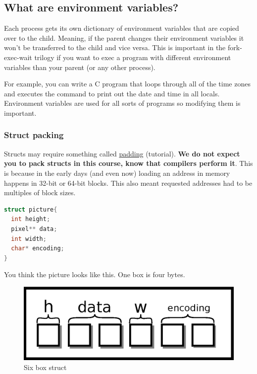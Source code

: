 \subsection{What are environment variables?}

Each process gets its own dictionary of environment variables that are copied over to the child. Meaning, if the parent changes their environment variables it won't be transferred to the child and vice versa. This is important in the fork-exec-wait trilogy if you want to exec a program with different environment variables than your parent (or any other process).

For example, you can write a C program that loops through all of the time zones and executes the  command to print out the date and time in all locals. Environment variables are used for all sorts of programs so modifying them is important.


\subsubsection{Struct packing}

Structs may require something called \href{http://www.catb.org/esr/structure-packing/}{padding} (tutorial).
\textbf{We do not expect you to pack structs in this course, know that compilers perform it}.
This is because in the early days (and even now) loading an address in memory happens in 32-bit or 64-bit blocks.
This also meant requested addresses had to be multiples of block sizes.

\begin{lstlisting}[language=C]
struct picture{
  int height;
  pixel** data;
  int width;
  char* encoding;
}
\end{lstlisting}

You think the picture looks like this.
One box is four bytes.

\begin{figure}[H]
\centering
\includegraphics[width=.7\textwidth]{appendix/drawings/struct_clean.eps}
\caption{Six box struct}
\label{fig:clean_struct}
\end{figure}

